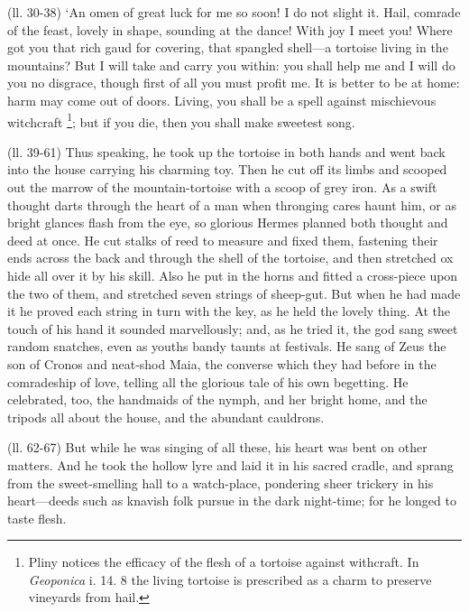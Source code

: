 (ll. 30-38) ‘An omen of great luck for me so soon! I do not slight it.
Hail, comrade of the feast, lovely in shape, sounding at the dance! With joy I
meet you! Where got you that rich gaud for covering, that spangled
shell—a tortoise living in the mountains? But I will take and carry you
within: you shall help me and I will do you no disgrace, though first of all
you must profit me. It is better to be at home: harm may come out of doors.
Living, you shall be a spell against mischievous witchcraft \footnote{Pliny notices the efficacy
of the flesh of a tortoise against withcraft. In \emph{Geoponica} i. 14.
8 the living tortoise is prescribed as a charm to preserve vineyards from
hail.}; but if you die, then you shall
make sweetest song.

(ll. 39-61) Thus speaking, he took up the tortoise in both hands and went back
into the house carrying his charming toy. Then he cut off its limbs and scooped
out the marrow of the mountain-tortoise with a scoop of grey iron. As a swift
thought darts through the heart of a man when thronging cares haunt him, or as
bright glances flash from the eye, so glorious Hermes planned both thought and
deed at once. He cut stalks of reed to measure and fixed them, fastening their
ends across the back and through the shell of the tortoise, and then stretched
ox hide all over it by his skill. Also he put in the horns and fitted a
cross-piece upon the two of them, and stretched seven strings of sheep-gut. But
when he had made it he proved each string in turn with the key, as he held the
lovely thing. At the touch of his hand it sounded marvellously; and, as he
tried it, the god sang sweet random snatches, even as youths bandy taunts at
festivals. He sang of Zeus the son of Cronos and neat-shod Maia, the converse
which they had before in the comradeship of love, telling all the glorious tale
of his own begetting. He celebrated, too, the handmaids of the nymph, and her
bright home, and the tripods all about the house, and the abundant cauldrons.

(ll. 62-67) But while he was singing of all these, his heart was bent on other
matters. And he took the hollow lyre and laid it in his sacred cradle, and
sprang from the sweet-smelling hall to a watch-place, pondering sheer trickery
in his heart—deeds such as knavish folk pursue in the dark night-time;
for he longed to taste flesh.

